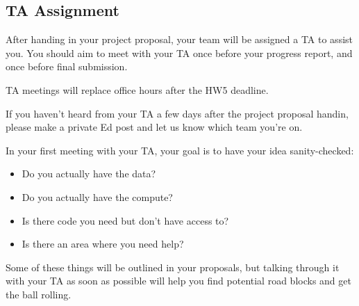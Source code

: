 \subsection*{TA Assignment}

After handing in your project proposal, your team will be assigned a TA to assist you.
You should aim to meet with your TA once before your progress report, and once before final submission. 

TA meetings will replace office hours after the HW5 deadline.

If you haven't heard from your TA a few days after the project proposal handin, please make a private Ed post and let us know which team you're on.

In your first meeting with your TA, your goal is to have your idea sanity-checked:

\begin{itemize}
  \item Do you actually have the data?
  \item Do you actually have the compute?
  \item Is there code you need but don't have access to?
  \item Is there an area where you need help?
\end{itemize}

Some of these things will be outlined in your proposals, but talking through it with your TA as soon as possible will help you find potential road blocks and get the ball rolling.

